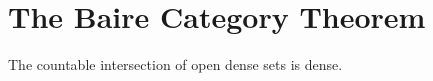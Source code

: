 \section{The Baire Category Theorem}

\begin{theorem}
    The countable intersection of open dense sets is dense.  
\end{theorem}

